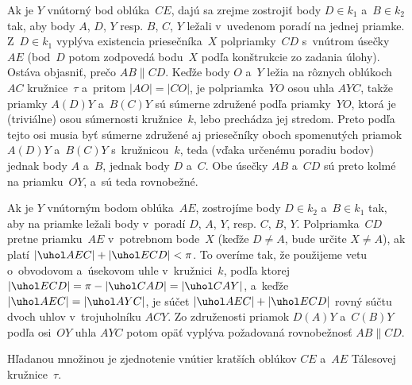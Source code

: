 {Ak je $Y$ vnútorný bod oblúka~$CE$, dajú sa zrejme zostrojiť
body $D\in k_1$ a~$B\in k_2$ tak,
aby body $A$, $D$, $Y$  resp. $B$, $C$, $Y$
ležali v~uvedenom poradí na jednej priamke. Z~${D\in k_1}$ vyplýva
existencia priesečníka~$X$ polpriamky~$CD$ s~vnútrom úsečky~$AE$
(bod~$D$ potom zodpovedá bodu~$X$ podľa konštrukcie zo zadania úlohy).
Ostáva objasniť, prečo $AB\parallel CD$.
Keďže body $O$ a~$Y$ ležia na
rôznych oblúkoch~$AC$ kružnice~$\tau$ a~pritom $|AO|=|CO|$, je
polpriamka~$YO$ osou uhla $AYC$, takže priamky $A(D)Y$ a~$B(C)Y$ sú
súmerne združené podľa priamky~$YO$, ktorá je (triviálne) osou
súmernosti kružnice~$k$, lebo prechádza jej stredom. Preto
podľa tejto osi musia byť súmerne združené
aj priesečníky oboch spomenutých priamok
$A(D)Y$ a~$B(C)Y$ s~kružnicou~$k$, teda (vďaka určenému poradiu bodov)
jednak body $A$ a~$B$, jednak body $D$ a~$C$. Obe úsečky $AB$
a~$CD$ sú preto kolmé na priamku~$OY$, a~sú teda rovnobežné.

Ak je $Y$ vnútorným bodom oblúka~$AE$, zostrojíme body $D\in k_2$
a~$B\in k_1$ tak, aby na priamke ležali body v~poradí $D$, $A$, $Y$, resp.
$C$, $B$, $Y$. Polpriamka~$CD$ pretne priamku~$AE$ v~potrebnom bode~$X$
(keďže $D\ne A$, bude určite $X\ne A$), ak
platí $|\uhol AEC|+|\uhol ECD|<\pi$. To overíme tak, že použijeme
vetu o~obvodovom a~úsekovom uhle v~kružnici~$k$, podľa
ktorej $|\uhol ECD|=\pi-|\uhol CAD|=|\uhol CAY|$,
a~keďže $|\uhol AEC|=|\uhol AYC|$, je súčet $|\uhol AEC|+|\uhol ECD|$
rovný súčtu dvoch uhlov v~trojuholníku $ACY$.
Zo združenosti priamok $D(A)Y$ a~$C(B)Y$ podľa osi~$OY$ uhla $AYC$
potom opäť vyplýva
požadovaná rovnobežnosť ${AB\parallel CD}$.

\zaver
Hľadanou množinou je zjednotenie vnútier kratších oblúkov
$CE$ a~$AE$ Tálesovej kružnice~$\tau$.
}

